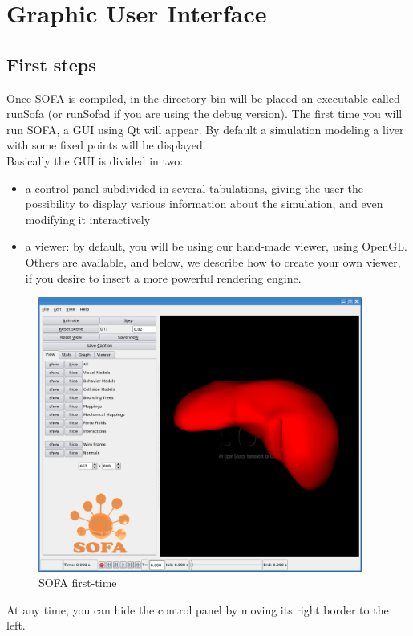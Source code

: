 
\newpage
\section{Graphic User Interface}
\subsection{First steps}
\par
Once SOFA is compiled, in the directory bin will be placed an executable called runSofa (or runSofad if you are using the debug version).
The first time you will run SOFA, a GUI using Qt will appear. By default a simulation modeling a liver with some fixed points will be displayed.\\
Basically the GUI is divided in two: 
\begin{itemize}
 \item a control panel subdivided in several tabulations, giving the user the possibility to display various information about the simulation, and even modifying it interactively
 \item a viewer: by default, you will be using our hand-made viewer, using OpenGL. Others are available, and below, we describe how to create your own viewer, if you desire to insert a more powerful rendering engine.
\end{itemize}

\begin{figure}[htpb]
	\centering
		\includegraphics[width=0.95\textwidth]{GUI/GUI.png}
	\caption{SOFA first-time}
\end{figure}
At any time, you can hide the control panel by moving its right border to the left.
\newline

